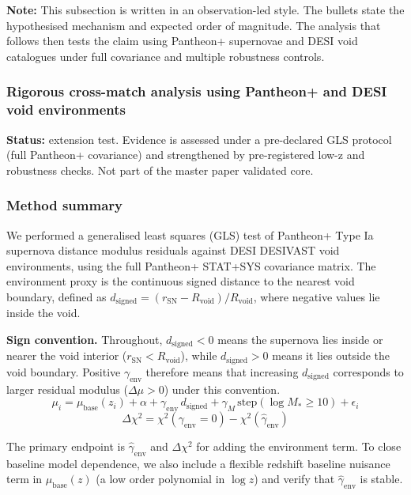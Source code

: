 \documentclass[11pt,a4paper]{article}
\begin{document}
\textbf{Note:} This subsection is written in an observation-led style. The bullets state the hypothesised mechanism and expected order of magnitude. The analysis that follows then tests the claim using Pantheon+ supernovae and DESI void catalogues under full covariance and multiple robustness controls.

\subsubsection{Rigorous cross-match analysis using Pantheon+ and DESI void environments}
\begin{mdframed}[linecolor=accent,linewidth=0.5pt,backgroundcolor=callout-bg,leftline=true,rightline=true,topline=true,bottomline=true,innerleftmargin=8pt,innerrightmargin=8pt,innertopmargin=6pt,innerbottommargin=6pt]
\textbf{Status:} extension test. Evidence is assessed under a pre-declared GLS protocol (full Pantheon+ covariance) and strengthened by pre-registered low-z and robustness checks. Not part of the master paper validated core.
\end{mdframed}

\subsubsection{Method summary}
We performed a generalised least squares (GLS) test of Pantheon+ Type Ia supernova distance modulus residuals against DESI DESIVAST void environments,
using the full Pantheon+ STAT+SYS covariance matrix. The environment proxy is the continuous signed distance to the nearest void boundary,
defined as \(d_{\mathrm{signed}} = (r_{\mathrm{SN}} - R_{\mathrm{void}})/R_{\mathrm{void}}\), where negative values lie inside the void.

\textbf{Sign convention.} Throughout, \(d_{\mathrm{signed}} < 0\) means the supernova lies inside or nearer the void interior (\(r_{\mathrm{SN}} < R_{\mathrm{void}}\)), while \(d_{\mathrm{signed}} > 0\) means it lies outside the void boundary. Positive \(\gamma_{\mathrm{env}}\) therefore means that increasing \(d_{\mathrm{signed}}\) corresponds to larger residual modulus (\(\Delta\mu > 0\)) under this convention.
$$
\mu_i = \mu_{\mathrm{base}}(z_i) + \alpha + \gamma_{\mathrm{env}}\, d_{\mathrm{signed}} + \gamma_M\,\mathrm{step}(\log M_* \ge 10) + \epsilon_i
$$
$$
\Delta \chi^2 = \chi^2(\gamma_{\mathrm{env}} = 0) - \chi^2(\hat\gamma_{\mathrm{env}})
$$

The primary endpoint is \(\hat\gamma_{\mathrm{env}}\) and \(\Delta\chi^2\) for adding the environment term.
To close baseline model dependence, we also include a flexible redshift baseline nuisance term in \(\mu_{\mathrm{base}}(z)\) (a low order polynomial in \(\log z\))
and verify that \(\hat\gamma_{\mathrm{env}}\) is stable.
\end{document}

